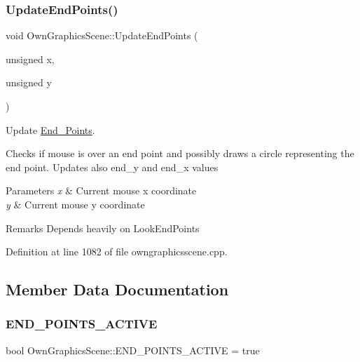 \mbox{\label{classOwnGraphicsScene_adf8d1495517483ba65c1ccbc95920a1c}} 
\subsubsection{\texorpdfstring{Update\+End\+Points()}{UpdateEndPoints()}}
{\footnotesize\ttfamily void Own\+Graphics\+Scene\+::\+Update\+End\+Points (\begin{DoxyParamCaption}\item[{unsigned}]{x,  }\item[{unsigned}]{y }\end{DoxyParamCaption})}



Update \mbox{\hyperlink{structEnd__Points}{End\+\_\+\+Points}}. 

Checks if mouse is over an end point and possibly draws a circle representing the end point. Updates also end\+\_\+y and end\+\_\+x values 
\begin{DoxyParams}{Parameters}
{\em x} & Current mouse x coordinate \\
\hline
{\em y} & Current mouse y coordinate \\
\hline
\end{DoxyParams}
\begin{DoxyRemark}{Remarks}
Depends heavily on Look\+End\+Points 
\end{DoxyRemark}


Definition at line 1082 of file owngraphicsscene.\+cpp.



\subsection{Member Data Documentation}
\mbox{\label{classOwnGraphicsScene_a511dd73ffc0a5f3ee28e8950d0636f5e}} 
\subsubsection{\texorpdfstring{E\+N\+D\+\_\+\+P\+O\+I\+N\+T\+S\+\_\+\+A\+C\+T\+I\+VE}{END\_POINTS\_ACTIVE}}
{\footnotesize\ttfamily bool Own\+Graphics\+Scene\+::\+E\+N\+D\+\_\+\+P\+O\+I\+N\+T\+S\+\_\+\+A\+C\+T\+I\+VE = true\hspace{0.3cm}{\ttfamily [static]}}

